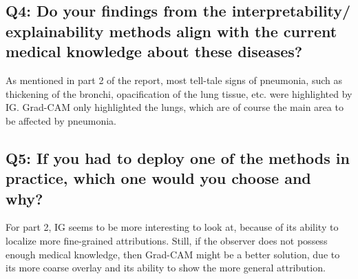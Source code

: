 \subsection*{Q4: Do your findings from the interpretability/ explainability methods align with the current medical knowledge about these diseases?}
As mentioned in part 2 of the report, most tell-tale signs of pneumonia, such as thickening of the bronchi, opacification of the lung tissue, etc. were highlighted by IG. Grad-CAM only highlighted the lungs, which are of course the main area to be affected by pneumonia.

\subsection*{Q5: If you had to deploy one of the methods in practice, which one would you choose and why?}
For part 2, IG seems to be more interesting to look at, because of its ability to localize more fine-grained attributions. Still, if the observer does not possess enough medical knowledge, then Grad-CAM might be a better solution, due to its more coarse overlay and its ability to show the more general attribution.
